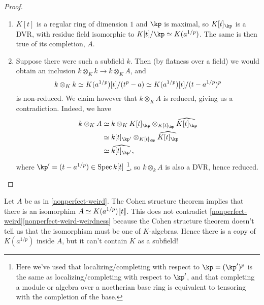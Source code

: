 \begin{proof}
  \begin{enumerate}[leftmargin=*]
  \item $K[t]$ is a regular ring of dimension $1$ and $\kp$ is maximal, so $K[t]_\kp$ is a DVR, with residue field isomorphic to $K[t]/\kp \iso K(a^{1/p})$. The same is then true of its completion, $A$.

  \item Suppose there were such a subfield $k$. Then (by flatness over a field) we would obtain an inclusion $k \otimes_K k \to k \otimes_K A$, and
    \[
      k \otimes_K k \simeq K(a^{1/p})[t]/(t^p-a) \simeq K(a^{1/p})[t]/(t-a^{1/p})^p
    \]
    is non-reduced. We claim however that $k \otimes_K A$ is reduced, giving us a contradiction. Indeed, we have
    \begin{align*}
      k \otimes_K A &\iso k \otimes_K K[t]_\kp \otimes_{K[t]_\kp} \hat{K[t]_\kp} \\
                    &\iso k[t]_{\kp'} \otimes_{K[t]_\kp} \hat{K[t]_\kp} \\
                    &\iso \hat{k[t]_{\kp'}},
    \end{align*}
    where $\kp' = (t - a^{1/p}) \in \Spec k[t]$ \footnote{Here we've used that localizing/completing with respect to $\kp = (\kp')^p$ is the same as localizing/completing with respect to $\kp'$, and that completing a module or algebra over a noetherian base ring is equivalent to tensoring with the completion of the base.}, so $k \otimes_k A$ is also a DVR, hence reduced. \qedhere
  \end{enumerate}
\end{proof}

\begin{remark}
  \label{cohen-uncontradicted}
  Let $A$ be as in \cref{nonperfect-weird}. The Cohen structure theorem implies that there is an isomorphim $A \simeq K(a^{1/p})\llbracket t \rrbracket$. This does not contradict \cref{nonperfect-weird}\cref{nonperfect-weird-weirdness} because the Cohen structure theorem doesn't tell us that the isomorphism must be one of $K$-algebras. Hence there is a copy of $K(a^{1/p})$ inside $A$, but it can't contain $K$ as a subfield!
\end{remark}



